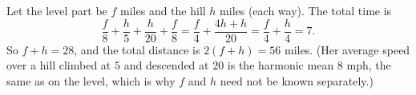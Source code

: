 Let the level part be $f$ miles and the hill $h$ miles (each way). The total time is
\[\dfrac{f}{8}+\dfrac{h}{5}+\dfrac{h}{20}+\dfrac{f}{8}=\dfrac {f}{4}+\dfrac{4h+h}{20}=\dfrac {f}{4}+\dfrac {h}{4}=7 .\]
So $f+h=28$, and the total distance is $2(f+h)=\boxed{56}$ miles. (Her average speed over a hill climbed at $5$ and descended at $20$ is the harmonic mean $8$ mph, the same as on the level, which is why $f$ and $h$ need not be known separately.)
